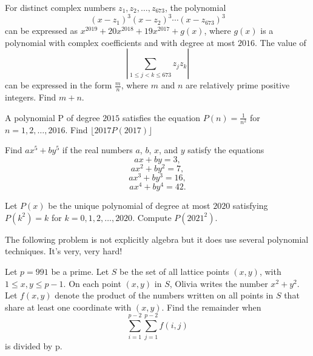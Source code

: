 \documentclass[mast]{lucky}
\begin{document}
\begin{prob}[AIME I 2019/10]{6}
For distinct complex numbers $z_1,z_2,\dots,z_{673}$, the polynomial\[(x-z_1)^3(x-z_2)^3 \cdots (x-z_{673})^3\]can be expressed as $x^{2019} + 20x^{2018} + 19x^{2017}+g(x)$, where $g(x)$ is a polynomial with complex coefficients and with degree at most $2016$. The value of\[\left| \sum_{1 \le j <k \le 673} z_jz_k \right|\]can be expressed in the form $\tfrac{m}{n}$, where $m$ and $n$ are relatively prime positive integers. Find $m+n$.
\end{prob}

\begin{prob}{9}
A polynomial P of degree $2015$ satisfies the equation $P(n) = \frac{1}{n^2}$ for $n = 1, 2, \ldots , 2016$. Find
$\lfloor 2017P(2017) \rfloor$
\end{prob}

\begin{prob}[AIME 1990/15]{9}
Find $ax^5 + by^5$ if the real numbers $a$, $b$, $x$, and $y$ satisfy the equations\[ax + by = 3,\]\[ax^2 + by^2 = 7,\]\[ax^3 + by^3 = 16,\]\[ax^4 + by^4 = 42.\]
\end{prob}


\begin{prob}{12}
Let $P(x)$ be the unique polynomial of degree at most $2020$ satisfying $P(k^2) = k$ for $k = 0, 1, 2, \ldots , 2020$.
Compute $P(2021^2)$.
\end{prob}

\begin{remark}
The following problem is not explicitly algebra but it does use several polynomial techniques. It\rq{}s very, very hard!
\end{remark}

\begin{prob}{21}
Let $p = 991$ be a prime. Let $S$ be the set of all lattice points $(x, y)$,
with $1 \leq x, y \leq p - 1$. On each point $(x, y)$ in $S$, Olivia writes the number $x^2 + y^2$. Let
$f(x, y)$ denote the product of the numbers written on all points in $S$ that share at least
one coordinate with $(x, y)$. Find the remainder when
$$\sum_{i=1}^{p-2} \sum_{j=1}^{p-2} f(i,j)$$
is divided by p.
\end{prob}
\end{document}
